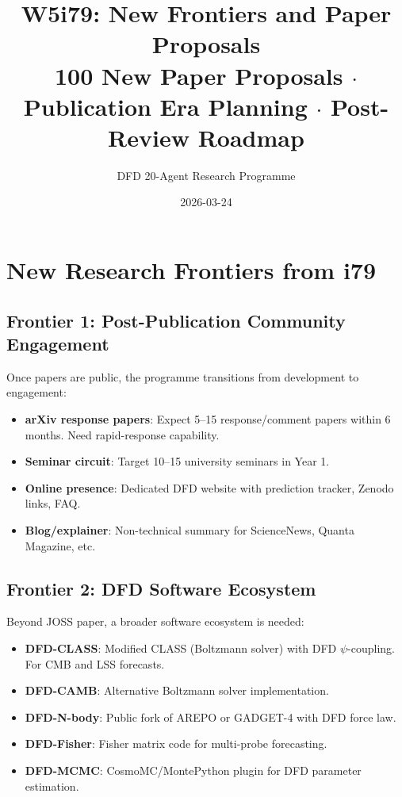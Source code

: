 \documentclass[11pt,a4paper]{article}
\title{W5i79: New Frontiers and Paper Proposals\\[6pt]
\large 100 New Paper Proposals $\cdot$ Publication Era Planning $\cdot$ Post-Review Roadmap}
\author{DFD 20-Agent Research Programme}
\date{2026-03-24}
\begin{document}
\maketitle

\section{New Research Frontiers from i79}

\subsection{Frontier 1: Post-Publication Community Engagement}
Once papers are public, the programme transitions from development to engagement:
\begin{itemize}[nosep]
\item \textbf{arXiv response papers}: Expect 5--15 response/comment papers within 6 months. Need rapid-response capability.
\item \textbf{Seminar circuit}: Target 10--15 university seminars in Year 1.
\item \textbf{Online presence}: Dedicated DFD website with prediction tracker, Zenodo links, FAQ.
\item \textbf{Blog/explainer}: Non-technical summary for ScienceNews, Quanta Magazine, etc.
\end{itemize}

\subsection{Frontier 2: DFD Software Ecosystem}
Beyond JOSS paper, a broader software ecosystem is needed:
\begin{itemize}[nosep]
\item \textbf{DFD-CLASS}: Modified CLASS (Boltzmann solver) with DFD $\psi$-coupling. For CMB and LSS forecasts.
\item \textbf{DFD-CAMB}: Alternative Boltzmann solver implementation.
\item \textbf{DFD-N-body}: Public fork of AREPO or GADGET-4 with DFD force law.
\item \textbf{DFD-Fisher}: Fisher matrix code for multi-probe forecasting.
\item \textbf{DFD-MCMC}: CosmoMC/MontePython plugin for DFD parameter estimation.
\end{itemize}
\end{document}
